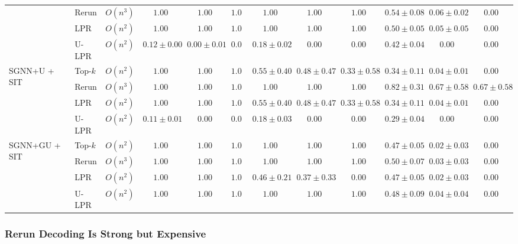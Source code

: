 \documentclass[journal,article,submit,pdftex,moreauthors]{Definitions/mdpi}
\begin{document}
\begin{table}[H]
{\begin{tabular}{lllccccccccc}
      & Rerun     & $O(n^3)$ & $1.00$ & $1.00$ & $1.00$
      & $1.00$ & $1.00$ & $1.00$
      & $0.54{\pm}0.08$ & $0.06{\pm}0.02$ & $0.00$ \\
      & LPR       & $O(n^2)$ & $1.00$ & $1.00$ & $1.00$
      & $1.00$ & $1.00$ & $1.00$
      & $0.50{\pm}0.05$ & $0.05{\pm}0.05$ & $0.00$ \\
      & U-LPR     & $O(n^2)$ & $0.12{\pm}0.00$ & $0.00{\pm}0.01$ & $0.00$
      & $0.18{\pm}0.02$ & $0.00$ & $0.00$
      & $0.42{\pm}0.04$ & $0.00$ & $0.00$ \\
      \midrule
      \multirow{4}{*}{SGNN+U + SIT}
      & Top-$k$   & $O(n^2)$ & $1.00$ & $1.00$ & $1.00$
      & $0.55{\pm}0.40$ & $0.48{\pm}0.47$ & $0.33{\pm}0.58$
      & $0.34{\pm}0.11$ & $0.04{\pm}0.01$ & $0.00$ \\
      & Rerun     & $O(n^3)$ & $1.00$ & $1.00$ & $1.00$
      & $1.00$ & $1.00$ & $1.00$
      & $\mathbf{0.82{\pm}0.31}$ & $\mathbf{0.67{\pm}0.58}$ & $\mathbf{0.67{\pm}0.58}$ \\
      & LPR       & $O(n^2)$ & $1.00$ & $1.00$ & $1.00$
      & $0.55{\pm}0.40$ & $0.48{\pm}0.47$ & $0.33{\pm}0.58$
      & $0.34{\pm}0.11$ & $0.04{\pm}0.01$ & $0.00$ \\
      & U-LPR     & $O(n^2)$ & $0.11{\pm}0.01$ & $0.00$ & $0.00$
      & $0.18{\pm}0.03$ & $0.00$ & $0.00$
      & $0.29{\pm}0.04$ & $0.00$ & $0.00$ \\
      \midrule
      \multirow{4}{*}{SGNN+GU + SIT}
      & Top-$k$   & $O(n^2)$ & $1.00$ & $1.00$ & $1.00$
      & $1.00$ & $1.00$ & $1.00$
      & $0.47{\pm}0.05$ & $0.02{\pm}0.03$ & $0.00$ \\
      & Rerun     & $O(n^3)$ & $1.00$ & $1.00$ & $1.00$
      & $1.00$ & $1.00$ & $1.00$
      & $0.50{\pm}0.07$ & $0.03{\pm}0.03$ & $0.00$ \\
      & LPR       & $O(n^2)$ & $1.00$ & $1.00$ & $1.00$
      & $0.46{\pm}0.21$ & $0.37{\pm}0.33$ & $0.00$
      & $0.47{\pm}0.05$ & $0.02{\pm}0.03$ & $0.00$ \\
      & U-LPR     & $O(n^2)$ & $\mathbf{1.00}$ & $\mathbf{1.00}$ & $\mathbf{1.00}$
      & $\mathbf{1.00}$ & $\mathbf{1.00}$ & $\mathbf{1.00}$
      & $0.48{\pm}0.09$ & $0.04{\pm}0.04$ & $0.00$ \\
      \bottomrule
    \end{tabular}%
  }
\end{table}

\subsubsection{Rerun Decoding Is Strong but Expensive}
\end{document}
